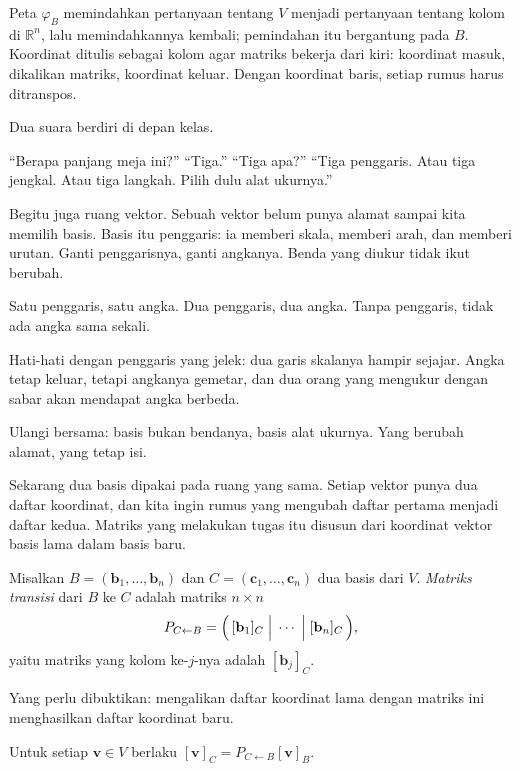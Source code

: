 Peta $\varphi_{B}$ memindahkan pertanyaan tentang $V$ menjadi pertanyaan tentang kolom di
$\mathbb{R}^{n}$, lalu memindahkannya kembali; pemindahan itu bergantung pada $B$. Koordinat
ditulis sebagai kolom agar matriks bekerja dari kiri: koordinat masuk, dikalikan matriks,
koordinat keluar. Dengan koordinat baris, setiap rumus harus ditranspos.

\begin{bacakeras}
Dua suara berdiri di depan kelas.

``Berapa panjang meja ini?''
``Tiga.''
``Tiga apa?''
``Tiga penggaris. Atau tiga jengkal. Atau tiga langkah. Pilih dulu alat ukurnya.''

Begitu juga ruang vektor. Sebuah vektor belum punya alamat sampai kita memilih basis. Basis
itu
penggaris: ia memberi skala, memberi arah, dan memberi urutan. Ganti penggarisnya, ganti
angkanya. Benda yang diukur tidak ikut berubah.

Satu penggaris, satu angka. Dua penggaris, dua angka. Tanpa penggaris, tidak ada angka sama
sekali.

Hati-hati dengan penggaris yang jelek: dua garis skalanya hampir sejajar. Angka tetap
keluar,
tetapi angkanya gemetar, dan dua orang yang mengukur dengan sabar akan mendapat angka
berbeda.

Ulangi bersama: basis bukan bendanya, basis alat ukurnya. Yang berubah alamat, yang tetap
isi.
\end{bacakeras}

Sekarang dua basis dipakai pada ruang yang sama. Setiap vektor punya dua daftar koordinat,
dan kita ingin rumus yang mengubah daftar pertama menjadi daftar kedua. Matriks yang
melakukan tugas itu disusun dari koordinat vektor basis lama dalam basis baru.

\begin{definisi}
Misalkan $B=(\mathbf{b}_{1},\dots,\mathbf{b}_{n})$ dan
$C=(\mathbf{c}_{1},\dots,\mathbf{c}_{n})$
dua basis dari $V$. \emph{Matriks transisi} dari $B$ ke $C$ adalah matriks $n\times n$
\[
P_{C\leftarrow
B}=\Bigl(\,[\mathbf{b}_{1}]_{C}\;\Big|\;\cdots\;\Big|\;[\mathbf{b}_{n}]_{C}\,\Bigr),
\]
yaitu matriks yang kolom ke-$j$-nya adalah $[\mathbf{b}_{j}]_{C}$.
\end{definisi}

Yang perlu dibuktikan: mengalikan daftar koordinat lama dengan matriks ini menghasilkan
daftar
koordinat baru.

\begin{teorema}
Untuk setiap $\mathbf{v}\in V$ berlaku $[\mathbf{v}]_{C}=P_{C\leftarrow B}[\mathbf{v}]_{B}$.
\end{teorema}

